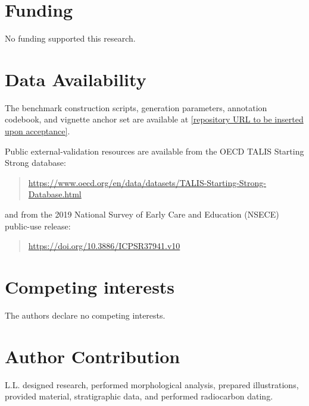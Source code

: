 \documentclass[pdflatex,sn-mathphys-num]{sn-jnl}%
\theoremstyle{thmstyleone}%
\theoremstyle{thmstyletwo}%
\theoremstyle{thmstylethree}%
\begin{document}
\section*{Funding}
No funding supported this research.

\section*{Data Availability}
The benchmark construction scripts, generation parameters, annotation codebook, and vignette anchor set are available at \url{[repository URL to be inserted upon acceptance]}.

Public external-validation resources are available from the OECD TALIS Starting Strong database:
\begin{quote}
\url{https://www.oecd.org/en/data/datasets/TALIS-Starting-Strong-Database.html}
\end{quote}
and from the 2019 National Survey of Early Care and Education (NSECE) public-use release:
\begin{quote}
\url{https://doi.org/10.3886/ICPSR37941.v10}
\end{quote}

\section*{Competing interests}
The authors declare no competing interests.

\section*{Author Contribution}
L.L. designed research, performed morphological analysis, prepared illustrations, provided material, stratigraphic data, and performed radiocarbon dating.


\end{document}

